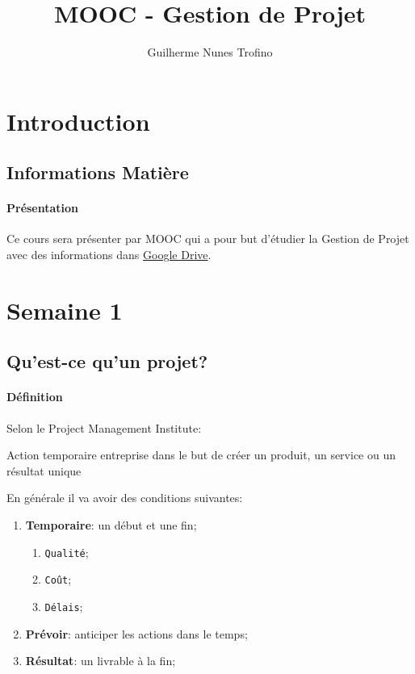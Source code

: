 \documentclass{article}
\title{MOOC - Gestion de Projet}
\author{Guilherme Nunes Trofino}
\begin{document}
\maketitle

\newpage\tableofcontents

\section{Introduction}

% 

\subsection{Informations Matière}
\paragraph{Présentation}Ce cours sera présenter par MOOC qui a pour but d'étudier la Gestion de Projet avec des informations dans \href{https://drive.google.com/drive/folders/0B2LN5eYzM2xhNlZORkVCQjBpQTA?resourcekey=0-hcgRqPSj5pIJUyyMe8y2cA}{Google Drive}.

\section{Semaine 1}
\subsection{Qu'est-ce qu'un projet?}
\paragraph{Définition}Selon le Project Management Institute:
\begin{phrase}
    Action temporaire entreprise dans le but de créer un produit, un service ou un résultat unique
\end{phrase}
En générale il va avoir des conditions suivantes:
\begin{enumerate}
    \item \textbf{Temporaire}: un début et une fin;
    \begin{enumerate}[noitemsep]
        \item \texttt{Qualité};
        \item \texttt{Coût};
        \item \texttt{Délais};
    \end{enumerate}
    \item \textbf{Prévoir}: anticiper les actions dans le temps;
    \item \textbf{Résultat}: un livrable à la fin;
\end{enumerate}
\end{document}
